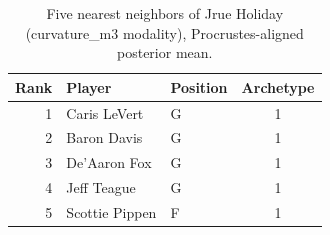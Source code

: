 \begin{table}[htbp]
  \centering\small
  \begin{tabular}{rllc}
    \toprule
    Rank & Player & Position & Archetype \\
    \midrule
    1 & Caris LeVert & G & 1 \\
    2 & Baron Davis & G & 1 \\
    3 & De'Aaron Fox & G & 1 \\
    4 & Jeff Teague & G & 1 \\
    5 & Scottie Pippen & F & 1 \\
    \bottomrule
  \end{tabular}
  \caption{Five nearest neighbors of Jrue Holiday (curvature_m3 modality), Procrustes-aligned posterior mean.}
  \label{tab:Jrue_Holiday_neighbors_curvature_m3}
\end{table}

